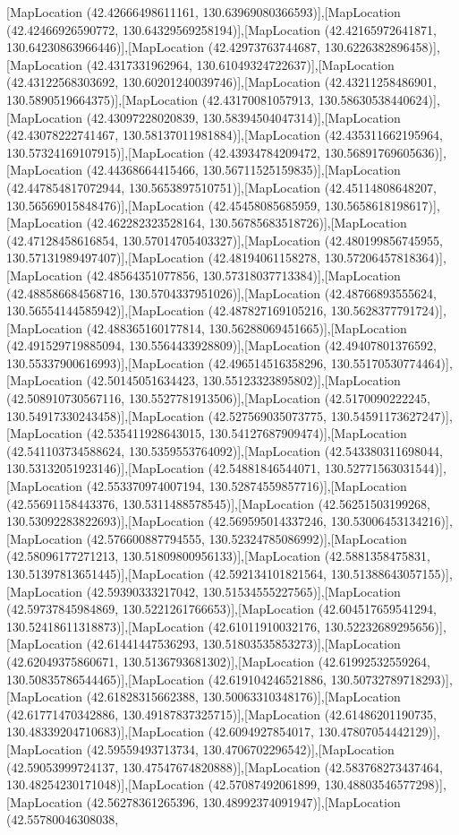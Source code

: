 [MapLocation (42.42666498611161, 130.63969080366593)],[MapLocation (42.42466926590772, 130.64329569258194)],[MapLocation (42.42165972641871, 130.64230863966446)],[MapLocation (42.42973763744687, 130.6226382896458)],[MapLocation (42.4317331962964, 130.61049324722637)],[MapLocation (42.43122568303692, 130.60201240039746)],[MapLocation (42.43211258486901, 130.5890519664375)],[MapLocation (42.43170081057913, 130.58630538440624)],[MapLocation (42.43097228020839, 130.58394504047314)],[MapLocation (42.43078222741467, 130.58137011981884)],[MapLocation (42.435311662195964, 130.57324169107915)],[MapLocation (42.43934784209472, 130.56891769605636)],[MapLocation (42.44368664415466, 130.56711525159835)],[MapLocation (42.447854817072944, 130.5653897510751)],[MapLocation (42.45114808648207, 130.56569015848476)],[MapLocation (42.45458085685959, 130.5658618198617)],[MapLocation (42.462282323528164, 130.56785683518726)],[MapLocation (42.47128458616854, 130.57014705403327)],[MapLocation (42.480199856745955, 130.57131989497407)],[MapLocation (42.48194061158278, 130.57206457818364)],[MapLocation (42.48564351077856, 130.57318037713384)],[MapLocation (42.488586684568716, 130.5704337951026)],[MapLocation (42.48766893555624, 130.56554144585942)],[MapLocation (42.487827169105216, 130.5628377791724)],[MapLocation (42.488365160177814, 130.56288069451665)],[MapLocation (42.491529719885094, 130.5564433928809)],[MapLocation (42.49407801376592, 130.55337900616993)],[MapLocation (42.496514516358296, 130.55170530774464)],[MapLocation (42.50145051634423, 130.55123323895802)],[MapLocation (42.508910730567116, 130.5527781913506)],[MapLocation (42.5170090222245, 130.54917330243458)],[MapLocation (42.527569035073775, 130.54591173627247)],[MapLocation (42.535411928643015, 130.54127687909474)],[MapLocation (42.541103734588624, 130.5359553764092)],[MapLocation (42.543380311698044, 130.53132051923146)],[MapLocation (42.54881846544071, 130.52771563031544)],[MapLocation (42.553370974007194, 130.52874559857716)],[MapLocation (42.55691158443376, 130.5311488578545)],[MapLocation (42.56251503199268, 130.53092283822693)],[MapLocation (42.569595014337246, 130.53006453134216)],[MapLocation (42.576600887794555, 130.52324785086992)],[MapLocation (42.58096177271213, 130.51809800956133)],[MapLocation (42.5881358475831, 130.51397813651445)],[MapLocation (42.592134101821564, 130.51388643057155)],[MapLocation (42.59390333217042, 130.51534555227565)],[MapLocation (42.59737845984869, 130.5221261766653)],[MapLocation (42.604517659541294, 130.52418611318873)],[MapLocation (42.61011910032176, 130.52232689295656)],[MapLocation (42.61441447536293, 130.51803535853273)],[MapLocation (42.62049375860671, 130.5136793681302)],[MapLocation (42.61992532559264, 130.50835786544465)],[MapLocation (42.619104246521886, 130.50732789718293)],[MapLocation (42.61828315662388, 130.50063310348176)],[MapLocation (42.61771470342886, 130.49187837325715)],[MapLocation (42.61486201190735, 130.48339204710683)],[MapLocation (42.6094927854017, 130.47807054442129)],[MapLocation (42.59559493713734, 130.4706702296542)],[MapLocation (42.59053999724137, 130.47547674820888)],[MapLocation (42.583768273437464, 130.48254230171048)],[MapLocation (42.57087492061899, 130.48803546577298)],[MapLocation (42.56278361265396, 130.48992374091947)],[MapLocation (42.55780046308038, 